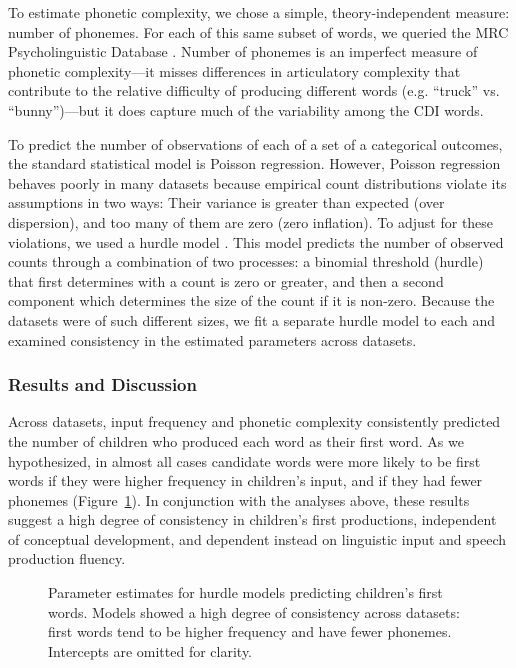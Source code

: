 \documentclass[10pt,letterpaper]{article}
\begin{document}
To estimate phonetic complexity, we chose a simple, theory-independent measure: number of phonemes. For each of this same subset of words, we queried the MRC Psycholinguistic Database \cite{Wilson1988}. Number of phonemes is an imperfect measure of phonetic complexity---it misses differences in articulatory complexity that contribute to the relative difficulty of producing different words (e.g. ``truck'' vs. ``bunny'')---but it does capture much of the variability among the CDI words.

To predict the number of observations of each of a set of a categorical outcomes, the standard statistical model is Poisson regression. However, Poisson regression behaves poorly in many datasets because empirical count distributions violate its assumptions in two ways: Their variance is greater than expected (over dispersion), and too many of them are zero (zero inflation). To adjust for these violations, we used a hurdle model \cite{mullahy1986}. This model predicts the number of observed counts through a combination of two processes: a binomial threshold (hurdle) that first determines with a count is zero or greater, and then a second component which determines the size of the count if it is non-zero. Because the datasets were of such different sizes, we fit a separate hurdle model to each and examined consistency in the estimated parameters across datasets.

\subsubsection{Results and Discussion}

Across datasets, input frequency and phonetic complexity consistently predicted the number of children who produced each word as their first word. As we hypothesized, in almost all cases candidate words were more likely to be first words if they were higher frequency in children's input, and if they had fewer phonemes (Figure~\ref{fig:hurdles}). In conjunction with the analyses above, these results suggest a high degree of consistency in children's first productions, independent of conceptual development, and dependent instead on linguistic input and speech production fluency.

\begin{figure}[h!]
\caption{\label{fig:hurdles} Parameter estimates for hurdle models predicting children's first words. Models showed a high degree of consistency across datasets: first words tend to be higher frequency and have fewer phonemes. Intercepts are omitted for clarity.}
\end{figure}
\end{document}
